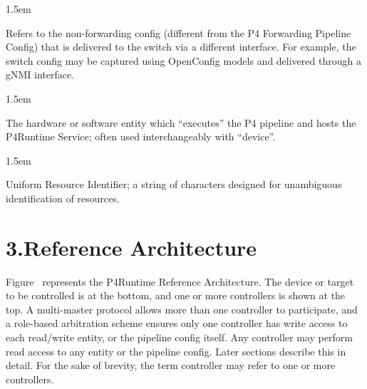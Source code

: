 \documentclass[11pt]{article}
\begin{document}
{\begin{mddefinitions}

\begin{mdbmarginx}{}{}{}{1.5em}%
\begin{mddefdata}%
Refers to the non-forwarding config (different from the P4 Forwarding
Pipeline Config) that is delivered to the switch via a different
interface. For example, the switch config may be captured using OpenConfig
models and delivered through a gNMI interface.
\end{mddefdata}%
\end{mdbmarginx}%


\begin{mdbmarginx}{}{}{}{1.5em}%
\begin{mddefdata}%
The hardware or software entity which \textquotedblleft{}executes\textquotedblright{} the P4 pipeline and hosts
the P4Runtime Service; often used interchangeably with \textquotedblleft{}device\textquotedblright{}.
\end{mddefdata}%
\end{mdbmarginx}%


\begin{mdbmarginx}{}{}{}{1.5em}%
\begin{mddefdata}%
Uniform Resource Identifier; a string of characters designed for unambiguous
identification of resources.%
\end{mddefdata}%
\end{mdbmarginx}%
\end{mddefinitions}%

\section{3.\hspace*{0.5em}Reference Architecture}\label{sec-reference-architecture}%

\noindent{}Figure~ represents the P4Runtime Reference
Architecture. The device or target to be controlled is at the bottom, and one or
more controllers is shown at the top. A multi-master protocol allows more than
one controller to participate, and a role-based arbitration scheme ensures only
one controller has write access to each read/write entity, or the pipeline
config itself. Any controller may perform read access to any entity or the
pipeline config. Later sections describe this in detail. For the sake of
brevity, the term controller may refer to one or more controllers.%

}
\end{document}
